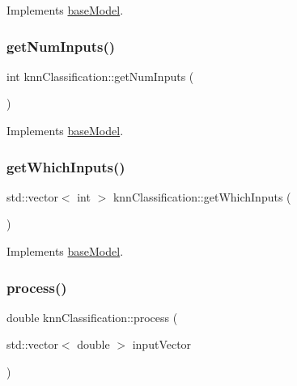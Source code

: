 Implements \hyperlink{classbase_model_a54c7ba2132721c2f990ea2fe2313f863}{base\+Model}.

\mbox{\label{classknn_classification_a3f9c8fb78c6a66f0ab9440629140400d}} 
\subsubsection{\texorpdfstring{get\+Num\+Inputs()}{getNumInputs()}}
{\footnotesize\ttfamily int knn\+Classification\+::get\+Num\+Inputs (\begin{DoxyParamCaption}{ }\end{DoxyParamCaption})\hspace{0.3cm}{\ttfamily [virtual]}}



Implements \hyperlink{classbase_model_a1601088280ebe5be525fd1fe49d4b1e1}{base\+Model}.

\mbox{\label{classknn_classification_af7db9297f695e67df6af08719da37921}} 
\subsubsection{\texorpdfstring{get\+Which\+Inputs()}{getWhichInputs()}}
{\footnotesize\ttfamily std\+::vector$<$ int $>$ knn\+Classification\+::get\+Which\+Inputs (\begin{DoxyParamCaption}{ }\end{DoxyParamCaption})\hspace{0.3cm}{\ttfamily [virtual]}}



Implements \hyperlink{classbase_model_a5d6b7579536f5713eed0b7b4a6687a16}{base\+Model}.

\mbox{\label{classknn_classification_a909050a125c4bf5cc2e48db0202fcb79}} 
\subsubsection{\texorpdfstring{process()}{process()}}
{\footnotesize\ttfamily double knn\+Classification\+::process (\begin{DoxyParamCaption}\item[{std\+::vector$<$ double $>$}]{input\+Vector }\end{DoxyParamCaption})\hspace{0.3cm}{\ttfamily [virtual]}}

